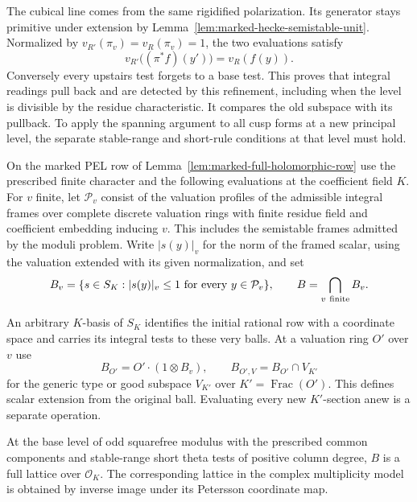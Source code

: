 The cubical line comes from the same rigidified polarization.
Its generator stays primitive under extension by
Lemma~\ref{lem:marked-hecke-semistable-unit}.
Normalized by \(v_{R'}(\pi_v)=v_R(\pi_v)=1\), the two evaluations
satisfy
\[
              v_{R'}\bigl((\pi^*f)(y')\bigr)=v_R(f(y)).
\]
Conversely every upstairs test forgets to a base test. This
proves that integral readings pull back and are detected by this
refinement, including when the level is divisible by the residue
characteristic. It compares the old subspace with its pullback.
To apply the spanning argument to all cusp forms at a new
principal level, the separate stable-range and short-rule
conditions at that level must hold.

\begin{auxlemma}
\label{lem:constructed-signed-coefficient-row}
On the marked PEL row of Lemma~\ref{lem:marked-full-holomorphic-row}
use the prescribed finite character and the following evaluations
at the coefficient field \(K\). For \(v\) finite, let
\(\mathcal P_v\) consist of the valuation profiles of the admissible
integral frames over complete discrete valuation rings with finite
residue field and coefficient embedding inducing \(v\). This includes
the semistable frames admitted by the moduli problem. Write \(|s(y)|_v\)
for the norm of the framed scalar, using the valuation extended
with its given normalization, and set
\[
 B_v=\{s\in S_K: |s(y)|_v\le1\ \text{for every }y\in\mathcal P_v\},
 \qquad B=\bigcap_{v\ {\rm finite}} B_v .
\]

An arbitrary \(K\)-basis of \(S_K\) identifies the initial rational
row with a coordinate space and carries its integral tests to these
very balls. At a valuation ring \(O'\) over \(v\) use
\[
 B_{O'}=O'\cdot(1\otimes B_v),\qquad
 B_{O',V}=B_{O'}\cap V_{K'}
\]
for the generic type or good subspace \(V_{K'}\)
over \(K'=\operatorname{Frac}(O')\). This defines scalar extension from
the original ball. Evaluating every new \(K'\)-section anew is a
separate operation.

At the base level of odd
squarefree modulus with the prescribed common components and
stable-range short theta tests of positive column degree, \(B\) is a full lattice over
\(\mathcal O_K\). The corresponding lattice in the complex
multiplicity model is obtained by inverse image under its
Petersson coordinate map.
\end{auxlemma}
